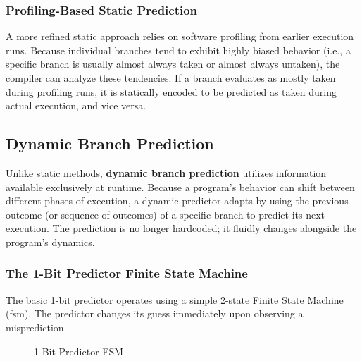 \subsubsection*{Profiling-Based Static Prediction}
A more refined static approach relies on software profiling from earlier execution runs. Because individual branches tend to exhibit highly biased behavior (i.e., a specific branch is usually almost always taken or almost always untaken), the compiler can analyze these tendencies. If a branch evaluates as mostly taken during profiling runs, it is statically encoded to be predicted as taken during actual execution, and vice versa.

\subsection{Dynamic Branch Prediction}

Unlike static methods, \textbf{dynamic branch prediction} utilizes information available exclusively at runtime. Because a program's behavior can shift between different phases of execution, a dynamic predictor adapts by using the previous outcome (or sequence of outcomes) of a specific branch to predict its next execution. The prediction is no longer hardcoded; it fluidly changes alongside the program's dynamics.

\subsubsection{The 1-Bit Predictor Finite State Machine}
The basic 1-bit predictor operates using a simple 2-state Finite State Machine (\gls{fsm}). The predictor changes its guess immediately upon observing a misprediction.

\begin{figure}[htpb]
    \centering
    \caption{1-Bit Predictor FSM}
    \label{fig:1bit-fsm}
\end{figure}

